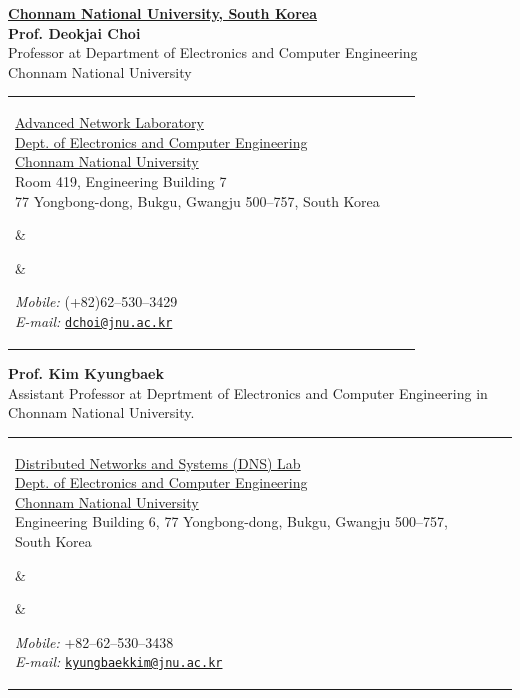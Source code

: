 \documentclass[10pt]{article}
\providecommand*\emaillink[1]{\nolinkurl{#1}}
\providecommand*\email[1]{\href{mailto:#1}{\emaillink{#1}}}
\begin{document}
\href{http://global.jnu.ac.kr/}{\textbf{Chonnam National University, South Korea }}\\

\textbf{Prof. Deokjai Choi}\\
Professor at Department of Electronics and Computer Engineering\\
Chonnam National University \\


\begin{tabular}[t]{@{}p{\textwidth-\rcollength-\spacewidth}@{}p{\spacewidth}@{}p{\rcollength}}%
	
	\parbox{\textwidth-\rcollength-\spacewidth}{%
		\href{http://netsys.jnu.ac.kr/web/}{Advanced Network Laboratory}\\
		\href{http://ece.chonnam.ac.kr/}{Dept. of Electronics and Computer Engineering}\\
		\href{http://global.jnu.ac.kr/}{Chonnam National University}\\
		Room 419, Engineering Building 7 \\
		77 Yongbong-dong, Bukgu, Gwangju 500--757, South Korea}
	
	
	&
	\parbox[m][5\baselineskip]{\spacewidth}{} &
	
	\parbox{\rcollength}{%
		\textit{Mobile:} (+82)62--530--3429 \\
		\textit{E-mail:} \email{dchoi@jnu.ac.kr}\\
	}
	
\end{tabular}

\hfill \break



\textbf{Prof. Kim Kyungbaek}\\
Assistant Professor at Deprtment of Electronics and Computer Engineering in Chonnam National University.


\begin{tabular}[t]{@{}p{\textwidth-\rcollength-\spacewidth}@{}p{\spacewidth}@{}p{\rcollength}}%
	
	\parbox{\textwidth-\rcollength-\spacewidth}{%
		\href{http://dnslab.jnu.ac.kr/}{Distributed Networks and Systems (DNS) Lab}\\
		\href{http://ece.chonnam.ac.kr/}{Dept. of Electronics and Computer Engineering}\\
		\href{http://global.jnu.ac.kr/}{Chonnam National University}\\
		Engineering Building 6,
		77 Yongbong-dong, Bukgu, Gwangju 500--757, South Korea}
	
	
	&
	\parbox[m][5\baselineskip]{\spacewidth}{} &
	
	\parbox{\rcollength}{%
		\textit{Mobile:} +82--62--530--3438 \\
		\textit{E-mail:} \email{kyungbaekkim@jnu.ac.kr}\\
	}
	
\end{tabular}
\end{document}
